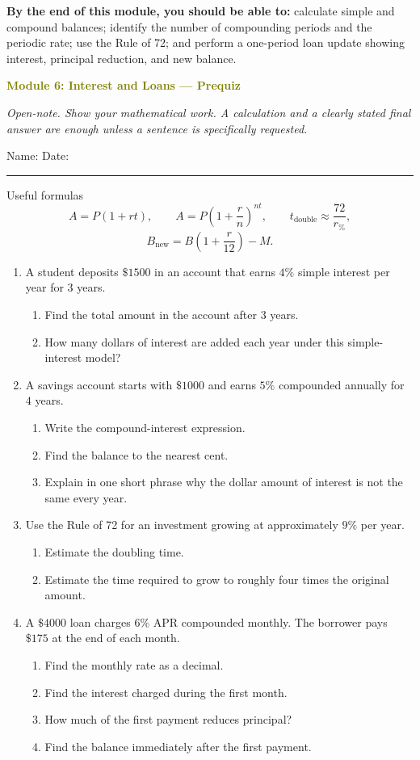 \documentclass[11pt]{article}
\newcommand{\prequizhead}[2]{%
  \clearpage
  {\Large\bfseries\textcolor{olive}{Module #1: #2 — Prequiz}}\par
  \textit{Open-note. Show your mathematical work. A calculation and a clearly stated final answer are enough unless a sentence is specifically requested.}\par
  Name: \hspace{2.6in} Date: \hspace{1.1in}\par
  \vspace{2pt}\textcolor{gold}{\rule{\linewidth}{1.2pt}}\par\smallskip
}
\newcommand{\workmed}{\par\vspace{0.62in}}
\newcommand{\worklarge}{\par\vspace{0.92in}}
\newcommand{\workxl}{\par\vspace{1.22in}}
\begin{document}
\textbf{By the end of this module, you should be able to:} calculate simple and compound balances; identify the number of compounding periods and the periodic rate; use the Rule of 72; and perform a one-period loan update showing interest, principal reduction, and new balance.

\prequizhead{6}{Interest and Loans}
\begin{refbox}{Useful formulas}
\[
A=P(1+rt),
\qquad
A=P\left(1+\frac rn\right)^{nt},
\qquad
t_{\text{double}}\approx\frac{72}{r_{\%}},
\]
\[
B_{\text{new}}=B\left(1+\frac r{12}\right)-M.
\]
\end{refbox}

\begin{enumerate}
\item A student deposits \(\$1500\) in an account that earns \(4\%\) simple interest per year for \(3\) years.
\begin{enumerate}[label=(\alph*),itemsep=4pt]
\item Find the total amount in the account after \(3\) years.
\item How many dollars of interest are added each year under this simple-interest model?
\end{enumerate}
\worklarge

\item A savings account starts with \(\$1000\) and earns \(5\%\) compounded annually for \(4\) years.
\begin{enumerate}[label=(\alph*),itemsep=4pt]
\item Write the compound-interest expression.
\item Find the balance to the nearest cent.
\item Explain in one short phrase why the dollar amount of interest is not the same every year.
\end{enumerate}
\worklarge

\item Use the Rule of 72 for an investment growing at approximately \(9\%\) per year.
\begin{enumerate}[label=(\alph*),itemsep=4pt]
\item Estimate the doubling time.
\item Estimate the time required to grow to roughly four times the original amount.
\end{enumerate}
\workmed

\item A \(\$4000\) loan charges \(6\%\) APR compounded monthly. The borrower pays \(\$175\) at the end of each month.
\begin{enumerate}[label=(\alph*),itemsep=4pt]
\item Find the monthly rate as a decimal.
\item Find the interest charged during the first month.
\item How much of the first payment reduces principal?
\item Find the balance immediately after the first payment.
\end{enumerate}
\workxl


\end{enumerate}
\end{document}
